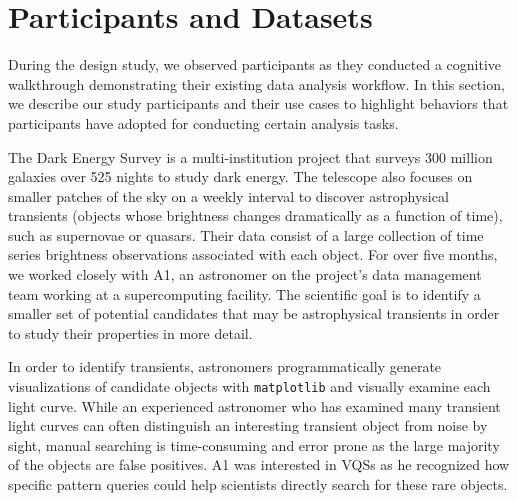 \section{Participants and Datasets}
During the design study, we observed participants as they conducted a cognitive walkthrough demonstrating their existing data analysis workflow. In this section, we describe our study participants and their use cases to highlight behaviors that participants have adopted for conducting certain analysis tasks.
\par\noindent{} The Dark Energy Survey is a multi-institution project that surveys 300 million galaxies over 525 nights to study dark energy. The telescope also focuses on smaller patches of the sky on a weekly interval to discover astrophysical transients (objects whose brightness changes dramatically as a function of time), such as supernovae or quasars. Their data consist of a large collection of time series brightness observations associated with each object. For over five months, we worked closely with A1, an astronomer on the project's data management team working at a supercomputing facility. The scientific goal is to identify a smaller set of potential candidates that may be astrophysical transients in order to study their properties in more detail. 
\par In order to identify transients, astronomers programmatically generate visualizations of candidate objects with \texttt{matplotlib} and visually examine each light curve. While an experienced astronomer who has examined many transient light curves can often distinguish an interesting transient object from noise by sight, manual searching is time-consuming and error prone as the large majority of the objects are false positives. A1 was interested in VQSs as he recognized how specific pattern queries could help scientists directly search for these rare objects.
